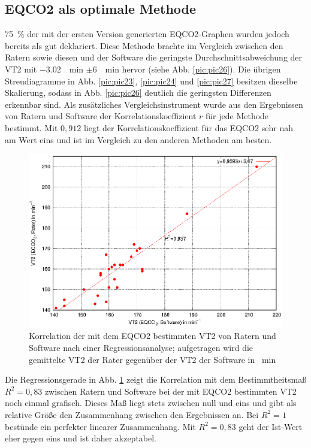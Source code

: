 \subsection{\acrshort{EQCO2} als optimale Methode}
%
75~\% der mit der ersten Version generierten \gls{EQCO2}-Graphen wurden jedoch bereits als gut deklariert. Diese Methode brachte im Vergleich zwischen den Ratern sowie diesen und der Software die geringste Durchschnittsabweichung der VT2 mit \SI{-3,02}{\per\minute} $\pm$\SI{6}{\per\minute} hervor (siehe Abb. \ref{pic:pic26}). Die übrigen Streudiagramme in Abb. \ref{pic:pic23}, \ref{pic:pic24} und \ref{pic:pic27} besitzen dieselbe Skalierung, sodass in Abb. \ref{pic:pic26} deutlich die geringsten Differenzen erkennbar sind. Als zusätzliches Vergleichsinstrument wurde aus den Ergebnissen von Ratern und Software der Korrelationskoeffizient $r$ für jede Methode bestimmt. Mit $0,912$ liegt der Korrelationskoeffizient für das \gls{EQCO2} sehr nah am Wert eins und ist im Vergleich zu den anderen Methoden am besten.
%
\begin{figure}[H]
	\centering
	\includegraphics[scale=0.95]{Bilder/korr_eqco2.eps}
	\caption[Korrelation der \acrshort{EQCO2}-Werte von Ratern und Software]{Korrelation der mit dem \acrshort{EQCO2} bestimmten VT2 von Ratern und Software nach einer Regressionsanalyse; aufgetragen wird die gemittelte VT2 der Rater gegenüber der VT2 der Software in \si{\per\minute}}
	\label{pic:pic28}
\end{figure}
%
Die Regressionsgerade in Abb. \ref{pic:pic28} zeigt die Korrelation mit dem Bestimmtheitsmaß $R^2 = 0,83$ zwischen Ratern und Software bei der mit \gls{EQCO2} bestimmten VT2 noch einmal grafisch. Dieses Maß liegt stets zwischen null und eins und gibt als relative Größe den Zusammenhang zwischen den Ergebnissen an. Bei $R^2 = 1$ bestünde ein perfekter linearer Zusammenhang. Mit $R^2 = 0,83$ geht der Ist-Wert eher gegen eins und ist daher akzeptabel.\\
